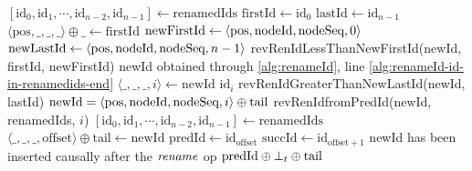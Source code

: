 \begin{algorithm}[!ht]
  \footnotesize
  \begin{algorithmic}[1]

        \Statex
        \State $[\text{id}_0, \text{id}_1, \cdots, \text{id}_{n-2}, \text{id}_{n-1}] \leftarrow \text{renamedIds}$
        \State $\text{firstId} \gets \text{id}_0$
        \State $\text{lastId} \gets \text{id}_{n - 1}$
        \State $\langle \text{pos}, \_, \_, \_ \rangle \oplus \text{\_} \leftarrow \text{firstId}$
        \State $\text{newFirstId} \gets \langle \text{pos},\text{nodeId},\text{nodeSeq},0 \rangle$
        \State $\text{newLastId} \gets \langle \text{pos},\text{nodeId},\text{nodeSeq},n-1 \rangle$
        \Statex
          \State \Return revRenIdLessThanNewFirstId(newId, firstId, newFirstId)
            \label{alg:revertRenameId-in-former-state}
            \Statex \Comment newId obtained through \autoref{alg:renameId}, line \ref{alg:renameId-id-in-renamedids-end}
            \State $\langle \_,\_,\_,i \rangle \leftarrow \text{newId}$
            \State \Return $\text{id}_i$ \label{alg:revertRenameId-case-i}
            \State \Return revRenIdGreaterThanNewLastId(newId, lastId)
        \Else
            \Statex \Comment $\text{newId} = \langle \text{pos},\text{nodeId},\text{nodeSeq},{i} \rangle \oplus \text{tail}$
            \State \Return revRenIdfromPredId(newId, renamedIds, $i$)
        \EndIf
    \EndFunction
    \Statex
        \Statex
        \State $[\text{id}_0, \text{id}_1, \cdots, \text{id}_{n-2}, \text{id}_{n-1}] \leftarrow \text{renamedIds}$
        \State $\langle \_,\_,\_, \text{offset} \rangle \oplus \text{tail} \leftarrow \text{newId}$ \label{alg:revertRenameId-offset}
        \State $\text{predId} \gets \text{id}_{\text{offset}}$ \label{alg:revertRenameId-predId}
        \State $\text{succId} \gets \text{id}_{\text{offset}+1}$ \label{alg:revertRenameId-succId}
        \Statex
            \Statex \Comment newId has been inserted causally after the $\mathit{rename}$ op
            \State \Return $\text{predId} \oplus \bot_t \oplus \text{tail}$ \Comment \commentbott \label{alg:revertRenameId-case-iii}

\end{algorithmic}
\end{algorithm}
